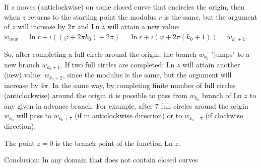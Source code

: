 \documentclass{article}
\begin{document}
If $z$ moves (anticlockwise) on some closed curve that encircles the origin, then when $z$ returns to the starting point the modulus $r$ is the same, but the argument of $z$ will increase by $2\pi$ and $\text{Ln } z$ will attain a new value: $w_{new} = \ln r + i((\varphi + 2\pi k_0) + 2\pi) = \ln r + i(\varphi + 2\pi(k_0 + 1)) = w_{k_0 + 1}$.

So, after completing a full circle around the origin, the branch $w_{k_0}$ "jumps" to a new branch $w_{k_0 + 1}$. If two full circles are completed: $\text{Ln } z$ will attain another (new) value: $w_{k_0 + 2}$, since the modulus is the same, but the argument will increase by $4\pi$. In the same way, by completing finite number of full circles (anticlockwise) around the origin it is possible to pass from $w_{k_0}$ branch of $\text{Ln } z$ to any given in advance branch. For example, after 7 full circles around the origin $w_{k_0}$ will pass to $w_{k_0 + 7}$ (if in anticlockwise direction) or to $w_{k_0 - 7}$ (if clockwise direction).

The point $z = 0$ is the branch point of the function $\text{Ln } z$.

Conclusion: In any domain that does not contain closed curves
\end{document}
